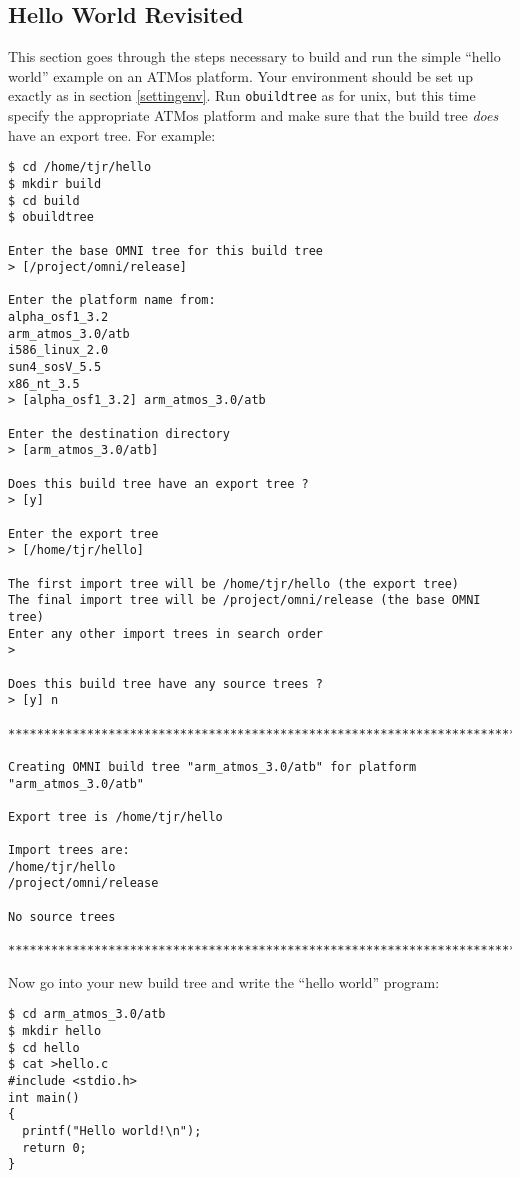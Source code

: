 \documentclass[11pt,twoside,onecolumn]{article}
\begin{document}
\subsection{Hello World Revisited}
\label{atmoshello}

This section goes through the steps necessary to build and run the simple
``hello world'' example on an ATMos platform.  Your environment should be set
up exactly as in section \ref{settingenv}.  Run {\tt obuildtree} as for unix,
but this time specify the appropriate ATMos platform and make sure that the
build tree {\em does} have an export tree. For example:

{\footnotesize \begin{verbatim}
$ cd /home/tjr/hello
$ mkdir build
$ cd build
$ obuildtree

Enter the base OMNI tree for this build tree
> [/project/omni/release] 

Enter the platform name from:
alpha_osf1_3.2
arm_atmos_3.0/atb
i586_linux_2.0
sun4_sosV_5.5
x86_nt_3.5
> [alpha_osf1_3.2] arm_atmos_3.0/atb

Enter the destination directory
> [arm_atmos_3.0/atb] 

Does this build tree have an export tree ?
> [y] 

Enter the export tree
> [/home/tjr/hello] 

The first import tree will be /home/tjr/hello (the export tree)
The final import tree will be /project/omni/release (the base OMNI tree)
Enter any other import trees in search order
> 

Does this build tree have any source trees ?
> [y] n

************************************************************************

Creating OMNI build tree "arm_atmos_3.0/atb" for platform "arm_atmos_3.0/atb"

Export tree is /home/tjr/hello

Import trees are:
/home/tjr/hello
/project/omni/release

No source trees

************************************************************************

\end{verbatim}}

Now go into your new build tree and write the ``hello world'' program:

{\footnotesize \begin{verbatim}
$ cd arm_atmos_3.0/atb 
$ mkdir hello
$ cd hello
$ cat >hello.c
#include <stdio.h>
int main()
{
  printf("Hello world!\n");
  return 0;
}
\end{verbatim}}
\end{document}
